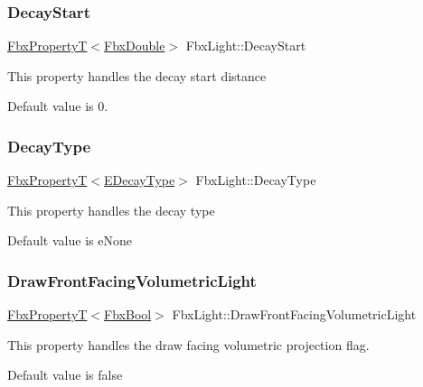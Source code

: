 \subsubsection{\texorpdfstring{Decay\+Start}{DecayStart}}
{\footnotesize\ttfamily \hyperlink{class_fbx_property_t}{Fbx\+PropertyT}$<$\hyperlink{fbxtypes_8h_a171e72a1c46fc15c1a6c9c31948c1c5b}{Fbx\+Double}$>$ Fbx\+Light\+::\+Decay\+Start}

This property handles the decay start distance

Default value is 0. \mbox{\label{class_fbx_light_aef58f45dfa9e83866792ed63b3e8ba21}} 
\subsubsection{\texorpdfstring{Decay\+Type}{DecayType}}
{\footnotesize\ttfamily \hyperlink{class_fbx_property_t}{Fbx\+PropertyT}$<$\hyperlink{class_fbx_light_a940254a9a826ab44a4cde044db1b3875}{E\+Decay\+Type}$>$ Fbx\+Light\+::\+Decay\+Type}

This property handles the decay type

Default value is e\+None \mbox{\label{class_fbx_light_aac35b91a53647b958436f966ce65d7f7}} 
\subsubsection{\texorpdfstring{Draw\+Front\+Facing\+Volumetric\+Light}{DrawFrontFacingVolumetricLight}}
{\footnotesize\ttfamily \hyperlink{class_fbx_property_t}{Fbx\+PropertyT}$<$\hyperlink{fbxtypes_8h_a92e0562b2fe33e76a242f498b362262e}{Fbx\+Bool}$>$ Fbx\+Light\+::\+Draw\+Front\+Facing\+Volumetric\+Light}

This property handles the draw facing volumetric projection flag.

Default value is false \mbox{\label{class_fbx_light_a924e57f289e13900b4579d8e8ffdbc93}} 
